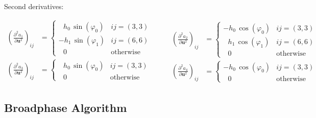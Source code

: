 Second derivatives:

\begin{equation*}
\begin{aligned}
\left(\frac{\partial^2 a_1}{\partial \boldsymbol{u}^2}\right)_{ij} &=
\begin{cases}
\:\:\:h_0\,\sin(\varphi_0) & \text{$ij = (3,3)$}\\
-h_1\,\sin(\varphi_1) & \text{$ij = (6,6)$}\\
\:\:\:0 & \text{otherwise}
\end{cases}\\
\left(\frac{\partial^2 a_3}{\partial \boldsymbol{u}^2}\right)_{ij} &=
\begin{cases}
\:\:\:h_0\,\sin(\varphi_0) & \text{$ij = (3,3)$}\\
\:\:\:0 & \text{otherwise}
\end{cases}\\
\end{aligned}
\qquad
\begin{aligned}
\left(\frac{\partial^2 a_2}{\partial \boldsymbol{u}^2}\right)_{ij} &=
\begin{cases}
-h_0\,\cos(\varphi_0) & \text{$ij = (3,3)$}\\
\:\:\:h_1\,\cos(\varphi_1) & \text{$ij = (6,6)$}\\
\:\:\:0 & \text{otherwise}
\end{cases}\\
\left(\frac{\partial^2 a_4}{\partial \boldsymbol{u}^2}\right)_{ij} &=
\begin{cases}
-h_0\,\cos(\varphi_0) & \text{$ij = (3,3)$}\\
\:\:\:0 & \text{otherwise}
\end{cases}
\end{aligned}
\end{equation*}

\subsection{Broadphase Algorithm}
